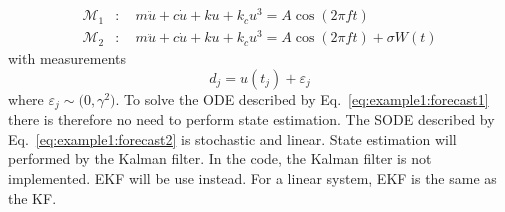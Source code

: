 \documentclass{article}
\begin{document}
\begin{align}
\mathcal{M}_1 &:\quad m \ddot{u} + c \dot{u} + k u + k_c u^3 = A \cos( 2 \pi f t ) 						\label{eq:example1:forecast1}  \\
\mathcal{M}_2 &:\quad m \ddot{u} + c \dot{u} + k u + k_c u^3 = A \cos( 2 \pi f t ) + \sigma W(t)		    \label{eq:example1:forecast2}
\end{align}
with measurements
\begin{equation}
d_j = u(t_j) + \varepsilon_j \label{eq:example1:meas}
\end{equation}
where $\varepsilon_j \sim \mathcal(0, \gamma^2)$. To solve the ODE described by Eq.~\eqref{eq:example1:forecast1} there is therefore no need to perform state estimation. The SODE described by Eq.~\eqref{eq:example1:forecast2} is stochastic and linear. State estimation will performed by the Kalman filter. In the code, the Kalman filter is not implemented. EKF will be use instead. For a linear system, EKF is the same as the KF.
\end{document}

